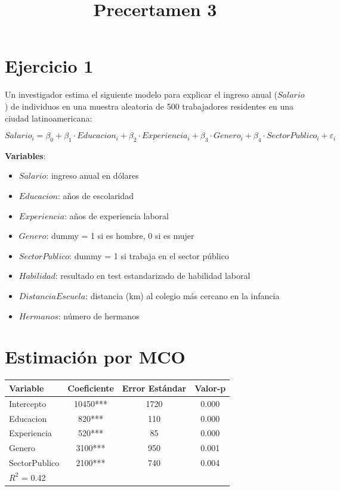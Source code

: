 \documentclass[12pt]{article}
\title{Precertamen 3}
\author{}
\date{}
\begin{document}
\maketitle

\section*{Ejercicio 1}
Un investigador estima el siguiente modelo para explicar el ingreso anual ($Salario$) de individuos en una muestra aleatoria de 500 trabajadores residentes en una ciudad latinoamericana:

\begin{equation}
Salario_i = \beta_0 + \beta_1 \cdot Educacion_i + \beta_2 \cdot Experiencia_i + \beta_3 \cdot Genero_i + \beta_4 \cdot SectorPublico_i + \varepsilon_i
\end{equation}

\textbf{Variables}:
\begin{itemize}
  \item $Salario$: ingreso anual en dólares
  \item $Educacion$: años de escolaridad
  \item $Experiencia$: años de experiencia laboral
  \item $Genero$: dummy = 1 si es hombre, 0 si es mujer
  \item $SectorPublico$: dummy = 1 si trabaja en el sector público
  \item $Habilidad$: resultado en test estandarizado de habilidad laboral
  \item $DistanciaEscuela$: distancia (km) al colegio más cercano en la infancia
  \item $Hermanos$: número de hermanos
\end{itemize}

\section*{Estimación por MCO}

\begin{center}
\begin{tabular}{lccc}
\toprule
Variable & Coeficiente & Error Estándar & Valor-p \\
\midrule
Intercepto       & 10450*** & 1720 & 0.000 \\
Educacion        & 820***   & 110  & 0.000 \\
Experiencia      & 520***   & 85   & 0.000 \\
Genero           & 3100***  & 950  & 0.001 \\
SectorPublico    & 2100***  & 740  & 0.004 \\
\midrule
$R^2$ = 0.42 & & & \\
\bottomrule
\end{tabular}
\end{center}
\end{document}
